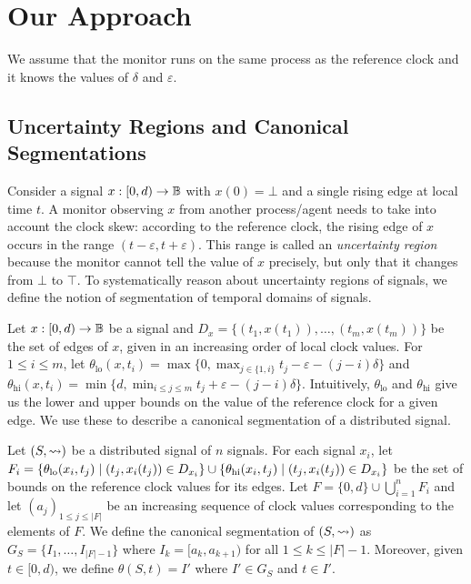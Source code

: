 \section{Our Approach}

We assume that the monitor runs on the same process as the reference clock and it knows the values of $\delta$ and $\varepsilon$.

\subsection{Uncertainty Regions and Canonical Segmentations}

Consider a signal $x : [0,d) \to \mathbb{B}$ with $x(0) = \bot$ and a single rising edge at local time $t$.
A monitor observing $x$ from another process/agent needs to take into account the clock skew: according to the reference clock, the rising edge of $x$ occurs in the range $(t - \varepsilon, t + \varepsilon)$.
This range is called an \emph{uncertainty region} because the monitor cannot tell the value of $x$ precisely, but only that it changes from $\bot$ to $\top$.
To systematically reason about uncertainty regions of signals, we define the notion of segmentation of temporal domains of signals.


Let $x : [0,d) \to \mathbb{B}$ be a signal and $D_x = \{(t_1, x(t_1)), \ldots, (t_m, x(t_m))\}$ be the set of edges of $x$, given in an increasing order of local clock values.
For $1 \leq i \leq m$, let $\theta_{\text{lo}}(x,t_i) = \max\{0, \max_{j \in \{1, i\}} t_j - \varepsilon - (j-i)\delta\}$ and $\theta_{\text{hi}}(x,t_i) = \min\{d, \min_{i \leq j \leq m} t_j + \varepsilon - (j-i)\delta\}$.
Intuitively, $\theta_{\text{lo}}$ and $\theta_{\text{hi}}$ give us the lower and upper bounds on the value of the reference clock for a given edge.
We use these to describe a canonical segmentation of a distributed signal.

Let $(S,{\rightsquigarrow})$ be a distributed signal of $n$ signals.
For each signal $x_i$, let $F_i = \{\theta_{\text{lo}}(x_i, t_j) \st (t_j, x_i(t_j)) \in D_{x_i}\} \cup \{\theta_{\text{hi}}(x_i, t_j) \st (t_j, x_i(t_j)) \in D_{x_i}\}$ be the set of bounds on the reference clock values for its edges.
Let $F = \{0, d\} \cup \bigcup_{i = 1}^{n} F_i$ and let $(a_j)_{1 \leq j \leq |F|}$ be an increasing sequence of clock values corresponding to the elements of $F$.
We define the canonical segmentation of $(S,{\rightsquigarrow})$ as $G_S = \{I_1, \ldots, I_{|F| - 1}\}$ where $I_k = [a_k, a_{k+1})$ for all $1 \leq k \leq |F| - 1$.
Moreover, given $t \in [0,d)$, we define $\theta(S,t) = I'$ where $I' \in G_S$ and $t \in I'$.

